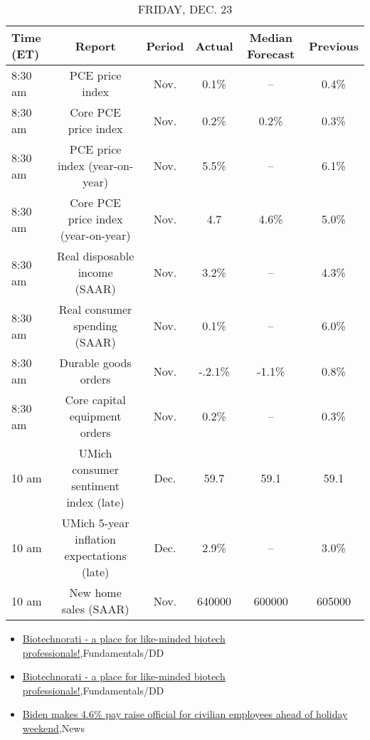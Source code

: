 \documentclass{article}%
\begin{document}
\begin{table}[htbp]%
\caption{FRIDAY, DEC. 23}%
\centering%
\begin{adjustbox}{width=1\textwidth}%
\begin{tabular}{lccccc}
\toprule
Time (ET) &                                     Report & Period & Actual & Median Forecast & Previous \\
\midrule
  8:30 am &                            PCE price index &   Nov. &   0.1\% &              -- &     0.4\% \\
  8:30 am &                       Core PCE price index &   Nov. &   0.2\% &            0.2\% &     0.3\% \\
  8:30 am &             PCE price index (year-on-year) &   Nov. &   5.5\% &              -- &     6.1\% \\
  8:30 am &        Core PCE price index (year-on-year) &   Nov. &    4.7 &            4.6\% &     5.0\% \\
  8:30 am &              Real disposable income (SAAR) &   Nov. &   3.2\% &              -- &     4.3\% \\
  8:30 am &              Real consumer spending (SAAR) &   Nov. &   0.1\% &              -- &     6.0\% \\
  8:30 am &                       Durable goods orders &   Nov. & -.2.1\% &           -1.1\% &     0.8\% \\
  8:30 am &              Core capital equipment orders &   Nov. &   0.2\% &              -- &     0.3\% \\
    10 am &      UMich consumer sentiment index (late) &   Dec. &   59.7 &            59.1 &     59.1 \\
    10 am & UMich 5-year inflation expectations (late) &   Dec. &   2.9\% &              -- &     3.0\% \\
    10 am &                      New home sales (SAAR) &   Nov. & 640000 &          600000 &   605000 \\
\bottomrule
\end{tabular}
%
\end{adjustbox}%
\end{table}

%
\begin{itemize}%
\item%
\href{https://reddit.com/r/StockMarket/comments/zu2p6m/biotechnorati\_a\_place\_for\_likeminded\_biotech/}{Biotechnorati - a place for like-minded biotech professionals!},Fundamentals/DD%
\item%
\href{https://reddit.com/r/StockMarket/comments/zu2ngi/biotechnorati\_a\_place\_for\_likeminded\_biotech/}{Biotechnorati - a place for like-minded biotech professionals!},Fundamentals/DD%
\item%
\href{https://reddit.com/r/Economics/comments/zu1ldh/biden\_makes\_46\_pay\_raise\_official\_for\_civilian/}{Biden makes 4.6\% pay raise official for civilian employees ahead of holiday weekend},News%
\end{itemize}%
\end{document}
